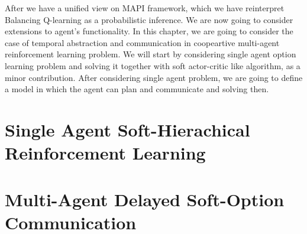 \label{chapter:chap6}
\begin{miniabstract}
After we have a unified view on MAPI framework, which we have reinterpret Balancing Q-learning \cite{grau2018balancing} as a probabilistic inference. We are now going to consider extensions to agent's functionality. In this chapter, we are going to consider the case of temporal abstraction and communication in coopeartive multi-agent reinforcement learning problem. We will start by considering single agent option learning problem and solving it together with soft actor-critic like algorithm, as a minor contribution. After considering single agent problem, we are going to define a model in which the agent can plan and communicate and solving then.
\end{miniabstract}


\section{Single Agent Soft-Hierachical Reinforcement Learning}


\section{Multi-Agent Delayed Soft-Option Communication}


